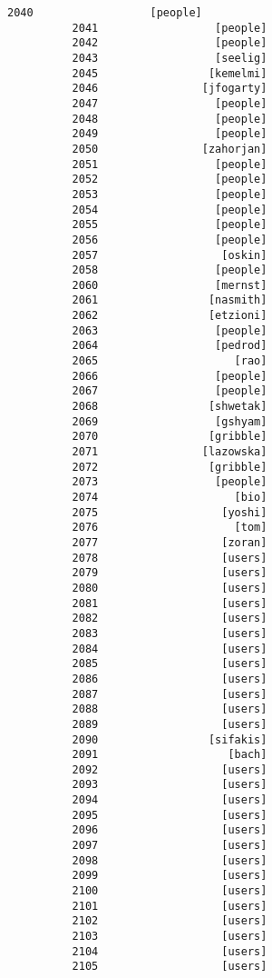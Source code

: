 \documentclass[11pt]{article}
\begin{document}
\begin{Verbatim}[commandchars=\\\{\}]
          2040                  [people]
          2041                  [people]
          2042                  [people]
          2043                  [seelig]
          2045                 [kemelmi]
          2046                [jfogarty]
          2047                  [people]
          2048                  [people]
          2049                  [people]
          2050                [zahorjan]
          2051                  [people]
          2052                  [people]
          2053                  [people]
          2054                  [people]
          2055                  [people]
          2056                  [people]
          2057                   [oskin]
          2058                  [people]
          2060                  [mernst]
          2061                 [nasmith]
          2062                 [etzioni]
          2063                  [people]
          2064                  [pedrod]
          2065                     [rao]
          2066                  [people]
          2067                  [people]
          2068                 [shwetak]
          2069                  [gshyam]
          2070                 [gribble]
          2071                [lazowska]
          2072                 [gribble]
          2073                  [people]
          2074                     [bio]
          2075                   [yoshi]
          2076                     [tom]
          2077                   [zoran]
          2078                   [users]
          2079                   [users]
          2080                   [users]
          2081                   [users]
          2082                   [users]
          2083                   [users]
          2084                   [users]
          2085                   [users]
          2086                   [users]
          2087                   [users]
          2088                   [users]
          2089                   [users]
          2090                 [sifakis]
          2091                    [bach]
          2092                   [users]
          2093                   [users]
          2094                   [users]
          2095                   [users]
          2096                   [users]
          2097                   [users]
          2098                   [users]
          2099                   [users]
          2100                   [users]
          2101                   [users]
          2102                   [users]
          2103                   [users]
          2104                   [users]
          2105                   [users]

\end{Verbatim}
\end{document}
